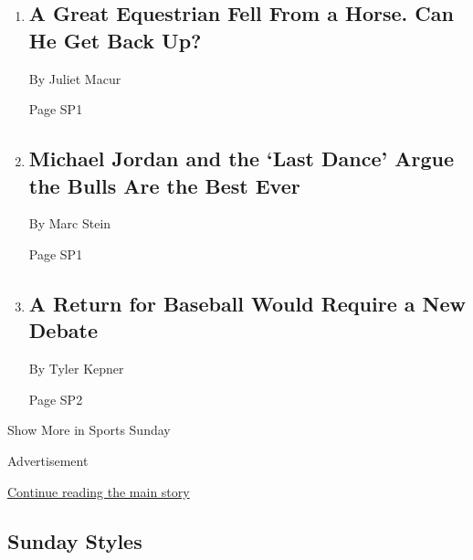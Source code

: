 \begin{enumerate}
\def\labelenumi{\arabic{enumi}.}
\item
  \href{/2020/04/17/sports/Kevin-Babington-show-jumping-recovery.html}{}

  \hypertarget{a-great-equestrian-fell-from-a-horse-can-he-get-back-up}{%
  \subsection{A Great Equestrian Fell From a Horse. Can He Get Back
  Up?}\label{a-great-equestrian-fell-from-a-horse-can-he-get-back-up}}

  By Juliet Macur

  Page SP1
\item
  \href{/2020/04/17/sports/basketball/michael-jordan-bulls-documentary.html}{}

  \hypertarget{michael-jordan-and-the-last-dance-argue-the-bulls-are-the-best-ever}{%
  \subsection{Michael Jordan and the `Last Dance' Argue the Bulls Are
  the Best
  Ever}\label{michael-jordan-and-the-last-dance-argue-the-bulls-are-the-best-ever}}

  By Marc Stein

  Page SP1
\item
  \href{/2020/04/18/sports/baseball/coronavirus-baseball.html}{}

  \hypertarget{a-return-for-baseball-would-require-a-new-debate}{%
  \subsection{A Return for Baseball Would Require a New
  Debate}\label{a-return-for-baseball-would-require-a-new-debate}}

  By Tyler Kepner

  Page SP2
\end{enumerate}

Show More in Sports Sunday

Advertisement

\protect\hyperlink{after-mid7}{Continue reading the main story}

\hypertarget{sunday-styles}{%
\subsection{Sunday Styles}\label{sunday-styles}}

